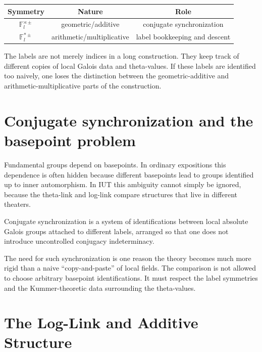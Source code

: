 \begin{center}
\begin{tabular}{c|c|c}
\toprule
Symmetry & Nature & Role \\
\midrule
\(\mathbb F_l^{\rtimes\pm}\) & geometric/additive & conjugate synchronization \\
\(\mathbb F_l^{\ast\pm}\) & arithmetic/multiplicative & label bookkeeping and descent \\
\bottomrule
\end{tabular}
\end{center}

\begin{remark}
The labels are not merely indices in a long construction.  They keep track of different copies of local Galois data and theta-values.  If these labels are identified too naively, one loses the distinction between the geometric-additive and arithmetic-multiplicative parts of the construction.
\end{remark}

\section{Conjugate synchronization and the basepoint problem}

Fundamental groups depend on basepoints.  In ordinary expositions this dependence is often hidden because different basepoints lead to groups identified up to inner automorphism.  In IUT this ambiguity cannot simply be ignored, because the theta-link and log-link compare structures that live in different theaters.

\begin{definition}
Conjugate synchronization is a system of identifications between local absolute Galois groups attached to different labels, arranged so that one does not introduce uncontrolled conjugacy indeterminacy.
\end{definition}

The need for such synchronization is one reason the theory becomes much more rigid than a naive ``copy-and-paste'' of local fields.  The comparison is not allowed to choose arbitrary basepoint identifications.  It must respect the label symmetries and the Kummer-theoretic data surrounding the theta-values.

\section{The Log-Link and Additive Structure}

